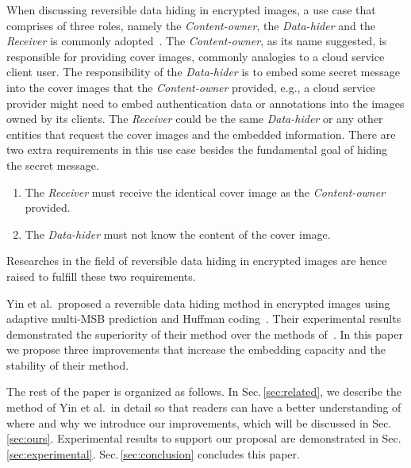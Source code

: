 
When discussing reversible data hiding in encrypted images, a use case that comprises of three roles, namely the \emph{Content-owner}, the \emph{Data-hider} and the \emph{Receiver} is commonly adopted~\cite{Qin2015}.
The \emph{Content-owner}, as its name suggested, is responsible for providing cover images, commonly analogies to a cloud service client user.
The responsibility of the \emph{Data-hider} is to embed some secret message into the cover images that the \emph{Content-owner} provided, e.g., a cloud service provider might need to embed authentication data or annotations into the images owned by its clients. 
The \emph{Receiver} could be the same \emph{Data-hider} or any other entities that request the cover images and the embedded information.
There are two extra requirements in this use case besides the fundamental goal of hiding the secret message. 
\begin{enumerate}
	\item The \emph{Receiver} must receive the identical cover image as the \emph{Content-owner} provided.
	\item The \emph{Data-hider} must not know the content of the cover image.
\end{enumerate}

Researches in the field of reversible data hiding in encrypted images are hence raised to fulfill these two requirements.






Yin et al.\ proposed a reversible data hiding method in encrypted images using adaptive multi-MSB prediction and Huffman coding~\cite{Yin2020}.
Their experimental results demonstrated the superiority of their method over the methods of~\cite{Puteaux2018, Chen2019, Puyang2019, Puteaux2019, Yi2019}.
In this paper
we propose three improvements that increase the embedding capacity and the stability of their method.


The rest of the paper is organized as follows. 
In Sec.\,\ref{sec:related}, we describe the method of Yin et al.\ in detail so that readers can have a better understanding of where and why we introduce our improvements, which will be discussed in Sec.\,\ref{sec:ours}. 
Experimental results to support our proposal are demonstrated in Sec.\,\ref{sec:experimental}.
Sec.\,\ref{sec:conclusion} concludes this paper. 